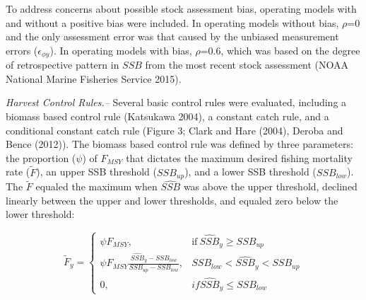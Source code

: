 \documentclass[]{article}
\begin{document}
To address concerns about possible stock assessment bias, operating
models with and without a positive bias were included. In operating
models without bias, \(\rho\)=0 and the only assessment error was that
caused by the unbiased measurement errors (\(\epsilon_{\phi y}\)). In
operating models with bias, \(\rho\)=0.6, which was based on the degree
of retrospective pattern in \(SSB\) from the most recent stock
assessment (NOAA National Marine Fisheries Service 2015).

\emph{Harvest Control Rules.--} Several basic control rules were
evaluated, including a biomass based control rule (Katsukawa 2004), a
constant catch rule, and a conditional constant catch rule (Figure 3;
Clark and Hare (2004), Deroba and Bence (2012)). The biomass based
control rule was defined by three parameters: the proportion (\(\psi\))
of \(F_{MSY}\) that dictates the maximum desired fishing mortality rate
(\(\tilde{F}\)), an upper SSB threshold (\(SSB_{up}\)), and a lower SSB
threshold (\(SSB_{low}\)). The \(\tilde{F}\) equaled the maximum when
\(\widehat{SSB}\) was above the upper threshold, declined linearly
between the upper and lower thresholds, and equaled zero below the lower
threshold:

\begin{equation}
  \label{Fy_equation}
    \tilde{F}_y=
    \begin{cases}
      \psi F_{MSY}, & \text{if}\ \widehat{SSB}_y \geq SSB_{up} \\
      \psi F_{MSY} \frac{\widehat{SSB}_y - SSB_{low}}{SSB_{up}-SSB_{low}}, & SSB_{low} < \widehat{SSB}_y < SSB_{up}\\
      0, & if \widehat{SSB}_y \leq SSB_{low}
    \end{cases}
  \end{equation}
\end{document}
